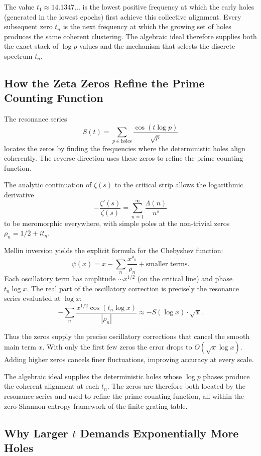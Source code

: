 \documentclass[11pt,a4paper]{article}
\begin{document}
The value \(t_1\approx14.1347\ldots\) is the lowest positive frequency at which the early holes (generated in the lowest epochs) first achieve this collective alignment. Every subsequent zero \(t_n\) is the next frequency at which the growing set of holes produces the same coherent clustering. The algebraic ideal therefore supplies both the exact stack of \(\log p\) values and the mechanism that selects the discrete spectrum \(t_n\).

\subsection{How the Zeta Zeros Refine the Prime Counting Function}

The resonance series
\[
S(t)=\sum_{p\in\text{holes}}\frac{\cos(t\log p)}{\sqrt{p}}
\]
locates the zeros by finding the frequencies where the deterministic holes align coherently. The reverse direction uses these zeros to refine the prime counting function.

The analytic continuation of \(\zeta(s)\) to the critical strip allows the logarithmic derivative
\[
-\frac{\zeta'(s)}{\zeta(s)} = \sum_{n=1}^\infty \frac{\Lambda(n)}{n^s}
\]
to be meromorphic everywhere, with simple poles at the non-trivial zeros \(\rho_n = 1/2 + i t_n\).

Mellin inversion yields the explicit formula for the Chebyshev function:
\[
\psi(x) = x - \sum_n \frac{x^{\rho_n}}{\rho_n} + \text{smaller terms}.
\]
Each oscillatory term has amplitude \(\sim x^{1/2}\) (on the critical line) and phase \(t_n \log x\). The real part of the oscillatory correction is precisely the resonance series evaluated at \(\log x\):
\[
-\sum_n \frac{x^{1/2} \cos(t_n \log x)}{|\rho_n|} \approx -S(\log x) \cdot \sqrt{x}.
\]

Thus the zeros supply the precise oscillatory corrections that cancel the smooth main term \(x\). With only the first few zeros the error drops to \(O(\sqrt{x} \log x)\). Adding higher zeros cancels finer fluctuations, improving accuracy at every scale.

The algebraic ideal supplies the deterministic holes whose \(\log p\) phases produce the coherent alignment at each \(t_n\). The zeros are therefore both located by the resonance series and used to refine the prime counting function, all within the zero-Shannon-entropy framework of the finite grating table.


\subsection{Why Larger \(t\) Demands Exponentially More Holes}
\end{document}
